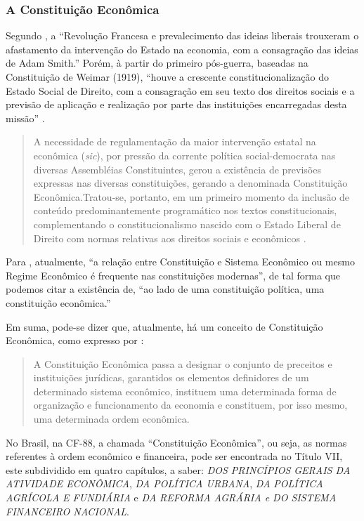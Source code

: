 \documentclass[]{article}
\begin{document}
\subsubsection{A Constituição Econômica}\label{a-constituicao-economica}

Segundo , a ``Revolução Francesa e
prevalecimento das ideias liberais trouxeram o afastamento da
intervenção do Estado na economia, com a consagração das ideias de Adam
Smith.'' Porém, à partir do primeiro pós-guerra, baseadas na
Constituição de Weimar (1919), ``houve a crescente constitucionalização
do Estado Social de Direito, com a consagração em seu texto dos direitos
sociais e a previsão de aplicação e realização por parte das
instituições encarregadas desta missão'' \cite[p.~859]{moraes}.

\begin{quote}
A necessidade de regulamentação da maior intervenção estatal na
econômica (\emph{sic}), por pressão da corrente política
social-democrata nas diversas Assembléias Constituintes, gerou a
existência de previsões expressas nas diversas constituições, gerando a
denominada Constituição Econômica.Tratou-se, portanto, em um primeiro
momento da inclusão de conteúdo predominantemente programático nos
textos constitucionais, complementando o constitucionalismo nascido com
o Estado Liberal de Direito com normas relativas aos direitos sociais e
econômicos \cite[p.~859]{moraes}.
\end{quote}

Para , atualmente, ``a relação entre
Constituição e Sistema Econômico ou mesmo Regime Econômico é frequente
nas constituições modernas'', de tal forma que podemos citar a
existência de, ``ao lado de uma constituição política, uma constituição
econômica.''

Em suma, pode-se dizer que, atualmente, há um conceito de Constituição
Econômica, como expresso por :

\begin{quote}
A Constituição Econômica passa a designar o conjunto de preceitos e
instituições jurídicas, garantidos os elementos definidores de um
determinado sistema econômico, instituem uma determinada forma de
organização e funcionamento da economia e constituem, por isso mesmo,
uma determinada ordem econômica.
\end{quote}

No Brasil, na CF-88, a chamada ``Constituição Econômica'', ou seja, as
normas referentes à ordem econômico e financeira, pode ser encontrada no
Título VII, este subdividido em quatro capítulos, a saber: \emph{DOS
PRINCÍPIOS GERAIS DA ATIVIDADE ECONÔMICA}, \emph{DA POLÍTICA URBANA},
\emph{DA POLÍTICA AGRÍCOLA E FUNDIÁRIA} e \emph{DA REFORMA AGRÁRIA e DO
SISTEMA FINANCEIRO NACIONAL}.
\end{document}

